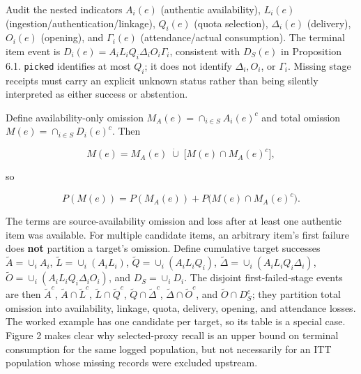 \documentclass[
  11pt]{article}
\begin{document}
Audit the nested indicators \(A_i(e)\) (authentic availability),
\(L_i(e)\) (ingestion/authentication/linkage), \(Q_i(e)\) (quota
selection), \(\Delta_i(e)\) (delivery), \(O_i(e)\) (opening), and
\(\Gamma_i(e)\) (attendance/actual consumption). The terminal item event
is \(D_i(e)=A_iL_iQ_i\Delta_iO_i\Gamma_i\), consistent with \(D_S(e)\)
in Proposition 6.1. \texttt{picked} identifies at most \(Q_i\); it does
not identify \(\Delta_i,O_i\), or \(\Gamma_i\). Missing stage receipts
must carry an explicit unknown status rather than being silently
interpreted as either success or abstention.

Define availability-only omission \(M_A(e)=\cap_{i\in S}A_i(e)^c\) and
total omission \(M(e)=\cap_{i\in S}D_i(e)^c\). Then

\[M(e)=M_A(e)\;\dot\cup\;\big[M(e)\cap M_A(e)^c\big],\]

so

\[P(M(e))=P(M_A(e))+P\big(M(e)\cap M_A(e)^c\big).\]

The terms are source-availability omission and loss after at least one
authentic item was available. For multiple candidate items, an arbitrary
item's first failure does \textbf{not} partition a target's omission.
Define cumulative target successes \(\widetilde A=\cup_iA_i\),
\(\widetilde L=\cup_i(A_iL_i)\), \(\widetilde Q=\cup_i(A_iL_iQ_i)\),
\(\widetilde\Delta=\cup_i(A_iL_iQ_i\Delta_i)\),
\(\widetilde O=\cup_i(A_iL_iQ_i\Delta_iO_i)\), and \(D_S=\cup_iD_i\).
The disjoint first-failed-stage events are then \(\widetilde A^c\),
\(\widetilde A\cap\widetilde L^c\), \(\widetilde L\cap\widetilde Q^c\),
\(\widetilde Q\cap\widetilde\Delta^c\),
\(\widetilde\Delta\cap\widetilde O^c\), and \(\widetilde O\cap D_S^c\);
they partition total omission into availability, linkage, quota,
delivery, opening, and attendance losses. The worked example has one
candidate per target, so its table is a special case. Figure 2 makes
clear why selected-proxy recall is an upper bound on terminal
consumption for the same logged population, but not necessarily for an
ITT population whose missing records were excluded upstream.
\end{document}
